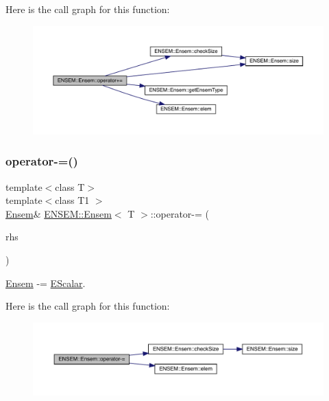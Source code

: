 Here is the call graph for this function\+:
\nopagebreak
\begin{figure}[H]
\begin{center}
\leavevmode
\includegraphics[width=350pt]{d7/d3e/classENSEM_1_1Ensem_ae24bd27a7f5a8ffed6ad4361956596fd_cgraph}
\end{center}
\end{figure}
\mbox{\label{classENSEM_1_1Ensem_a33710df08404883ee7790d2b67542971}} 
\subsubsection{\texorpdfstring{operator-\/=()}{operator-=()}\hspace{0.1cm}{\footnotesize\ttfamily [1/4]}}
{\footnotesize\ttfamily template$<$class T$>$ \\
template$<$class T1 $>$ \\
\mbox{\hyperlink{classENSEM_1_1Ensem}{Ensem}}\& \mbox{\hyperlink{classENSEM_1_1Ensem}{E\+N\+S\+E\+M\+::\+Ensem}}$<$ T $>$\+::operator-\/= (\begin{DoxyParamCaption}\item[{const \mbox{\hyperlink{classENSEM_1_1EScalar}{E\+Scalar}}$<$ T1 $>$ \&}]{rhs }\end{DoxyParamCaption})\hspace{0.3cm}{\ttfamily [inline]}}



\mbox{\hyperlink{classENSEM_1_1Ensem}{Ensem}} -\/= \mbox{\hyperlink{classENSEM_1_1EScalar}{E\+Scalar}}. 

Here is the call graph for this function\+:
\nopagebreak
\begin{figure}[H]
\begin{center}
\leavevmode
\includegraphics[width=350pt]{d7/d3e/classENSEM_1_1Ensem_a33710df08404883ee7790d2b67542971_cgraph}
\end{center}
\end{figure}
\mbox{\label{classENSEM_1_1Ensem_a33710df08404883ee7790d2b67542971}} 
